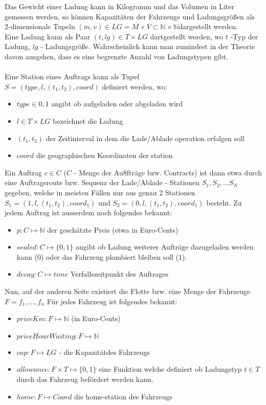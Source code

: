\documentclass{article}
\begin{document}
Das Gewicht einer Ladung kann in Kilogramm und das Volumen in Liter gemessen werden, so können Kapazitäten der Fahrzeuge und Ladungsgrößen als 2-dimensionale Tupeln $(m, v) \in LG = M \times V \subset 
\mathbb{N}\times\mathbb{N} $dargestellt werden.\\
Eine Ladung kann als Paar $(t, lg) \in T \times LG$ dartgestellt werden, wo $t$ -Typ der Ladung, $lg$ - Ladungsgröße. Wahrscheinlich kann man zumindest in der Theorie davon ausgehen, dass es eine begrenzte Anzahl von Ladungstypen gibt. \\
\\
Eine Station eines Auftrags kann als Tupel\\
$S = (type, l, (t_1, t_2), coord)$ definiert werden, wo:
\begin{itemize}
\item $type \in {0,1}$ angibt ob aufgeladen oder abgeladen wird
\item $l \in T \times LG$ bezeichnet die Ladung
\item $(t_1, t_2)$ der Zeitinterval in dem die Lade/Ablade operation erfolgen soll
\item $coord$ die geographischen Koordinaten der station
\end{itemize}

\noindent Ein Auftrag $c \in C$ ($C$ - Menge der Au8fträge bzw. Contracts) ist dann etwa durch eine Auftragsroute bzw. Sequenz der Lade/Ablade - Stationen $S_1, S_2, \dots S_N$ gegeben, welche in meisten Fällen nur aus genau 2 Stationen $S_1=(1, l, (t_1,t_2), coord_1)$ und $S_2=(0, l, (t_1,t_2), coord_1)$ besteht.
Zu jedem Auftrag ist ausserdem noch folgendes bekannt:
\begin{itemize}
\item $p: C \mapsto \mathbb{N}$ der geschätzte Preis (etwa in Euro-Cents)
\item $sealed: C \mapsto \{0,1\}$ angibt ob Ladung weiterer Aufträge dazugeladen werden kann ($0$) oder das Fahrzeug plombiert bleiben soll ($1$).
\item $decay: C \mapsto time$ Verfallszeitpunkt des Auftrages
\end{itemize}


Nun, auf der anderen Seite existiert die Flotte bzw. eine Menge der Fahrzeuge $F = {f_1, ..., f_n}$
Für jedes Fahrzeug ist folgendes bekannt:
\begin{itemize}
\item $priceKm: F \mapsto \mathbb{N}$ (in Euro-Cents)
\item $priceHourWaiting: F \mapsto \mathbb{N}$
\item $cap: F \mapsto LG$ - die Kapazitätdes Fahrzeugs
\item $allowance: F \times T \mapsto \{0,1\}$ eine Funktion welche definiert ob Ladungstyp $t \in T$ durch das Fahrzeug befördert werden kann.
\item $home: F \mapsto Coord$ die home-station des Fahrzeugs
\end{itemize}
\end{document}
